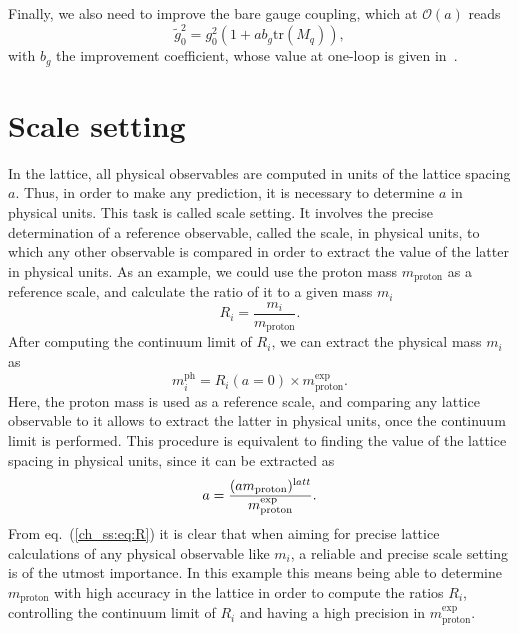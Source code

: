 Finally, we also need to improve the bare gauge coupling, which at $\mathcal{O}(a)$ reads
\begin{equation}
\tilde{g}_0^2=g_0^2\left(1+ab_g{\textrm{tr}}\left(M_q\right)\right),
\end{equation}
with $b_g$ the improvement coefficient, whose value at one-loop is given in~\cite{}.


\section{Scale setting}
\label{ch_foundation:sec:ss}

In the lattice, all physical observables are computed in units of the lattice spacing $a$. Thus, in order to make any prediction, it is necessary to determine $a$ in physical units. This task is called scale setting. It involves the precise determination of a reference observable, called the scale, in physical units, to which any other observable is compared in order to extract the value of the latter in physical units. As an example, we could use the proton mass $m_{\textrm{proton}}$ as a reference scale, and calculate the ratio of it to a given mass $m_i$
\begin{equation}
R_i=\frac{m_i}{m_{\textrm{proton}}}.
\end{equation}
After computing the continuum limit of $R_i$, we can extract the physical mass $m_i$ as
\begin{equation}
\label{ch_ss:eq:R}
m_i^{\textrm{ph}}=R_i(a=0)\times m_{\textrm{proton}}^{\textrm{exp}}.
\end{equation}
Here, the proton mass is used as a reference scale, and comparing any lattice observable to it allows to extract the latter in physical units, once the continuum limit is performed. This procedure is equivalent to finding the value of the lattice spacing in physical units, since it can be extracted as 
\begin{equation}
a=\frac{(am_{\textrm{proton}})^{\textrm latt}}{m_{\textrm{proton}}^{\textrm{exp}}}.
\end{equation}
From eq.~(\ref{ch_ss:eq:R}) it is clear that when aiming for precise lattice calculations of any physical observable like $m_i$, a reliable and precise scale setting is of the utmost importance. In this example this means being able to determine $m_{\textrm{proton}}$ with high accuracy in the lattice in order to compute the ratios $R_i$, controlling the continuum limit of $R_i$ and having a high precision in $m_{\textrm{proton}}^{\textrm{exp}}$.

